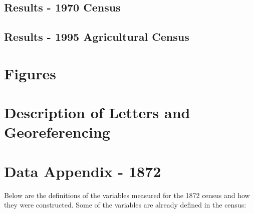 \documentclass{article}
\begin{document}


\clearpage



\clearpage

\subsection{Results - 1970 Census}

\clearpage

\subsection{Results - 1995 Agricultural Census}



\clearpage




\clearpage

\appendix

\setcounter{figure}{0}  
\setcounter{table}{0}  

\renewcommand{\thefigure}{A.\arabic{figure}}
\renewcommand{\thetable}{A.\arabic{table}}

\section{Figures}

\clearpage

\section{Description of Letters and Georeferencing}
\label{app:appendix_data}
\clearpage

\section{Data Appendix - 1872}
\label{app:variable_construction_1872}

Below are the definitions of the variables measured for the 1872 census and how they were constructed. Some of the variables are already defined in the census:
\end{document}
